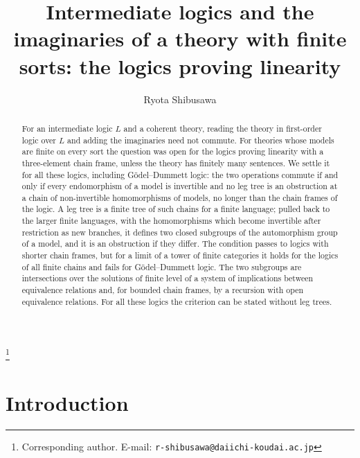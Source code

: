 \documentclass[11pt]{amsart}
\theoremstyle{definition}
\begin{document}
\title[Finite sorts and the logics proving linearity]{Intermediate logics
and the imaginaries of a theory with finite sorts: the logics proving
linearity}
\author{Ryota Shibusawa}
\thanks{Corresponding author. E-mail: \texttt{r-shibusawa@daiichi-koudai.ac.jp}}
\address{Daiichi Institute of Technology}

\begin{abstract}
For an intermediate logic $L$ and a coherent theory, reading the
theory in first-order logic over $L$ and adding the imaginaries need
not commute. For theories whose models are finite on every sort the
question was open for the logics proving linearity with a
three-element chain frame, unless the theory has finitely many
sentences. We settle it for all these logics, including
G\"odel--Dummett logic: the two operations commute if and only if
every endomorphism of a model is invertible and no leg tree is an
obstruction at a chain of non-invertible homomorphisms of models, no
longer than the chain frames of the logic. A leg tree is a finite tree of such chains for a finite
language; pulled back to the larger finite languages, with the
homomorphisms which become invertible after restriction as new
branches, it defines two closed subgroups of the automorphism group of
a model, and it is an obstruction if they differ. The condition passes
to logics with shorter chain frames, but for a limit
of a tower of finite categories it holds for the logics of all finite
chains and fails for G\"odel--Dummett logic. The two subgroups are
intersections over the solutions of finite level of a system of
implications between equivalence relations and,
for bounded chain frames, by a recursion with open equivalence
relations. For all these logics the criterion can be stated without
leg trees.
\end{abstract}

\maketitle

\section{Introduction}
\end{document}
